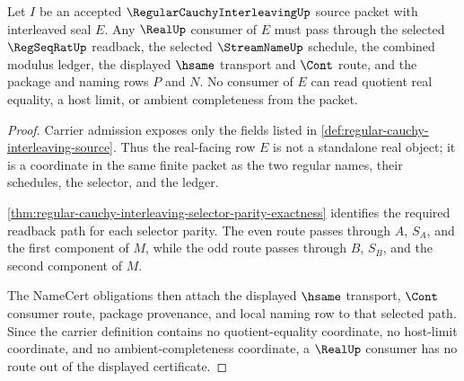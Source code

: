 \begin{theorem}
\label{thm:regular-cauchy-interleaving-real-seal-non-escape}
Let $I$ be an accepted $\RegularCauchyInterleavingUp$ source packet with interleaved seal $E$. Any $\RealUp$ consumer of $E$ must pass through the selected $\RegSeqRatUp$ readback, the selected $\StreamNameUp$ schedule, the combined modulus ledger, the displayed $\hsame$ transport and $\Cont$ route, and the package and naming rows $P$ and $N$. No consumer of $E$ can read quotient real equality, a host limit, or ambient completeness from the packet.
\end{theorem}
\begin{proof}
Carrier admission exposes only the fields listed in \autoref{def:regular-cauchy-interleaving-source}. Thus the real-facing row $E$ is not a standalone real object; it is a coordinate in the same finite packet as the two regular names, their schedules, the selector, and the ledger.

\autoref{thm:regular-cauchy-interleaving-selector-parity-exactness} identifies the required readback path for each selector parity. The even route passes through $A$, $S_A$, and the first component of $M$, while the odd route passes through $B$, $S_B$, and the second component of $M$.

The NameCert obligations then attach the displayed $\hsame$ transport, $\Cont$ consumer route, package provenance, and local naming row to that selected path. Since the carrier definition contains no quotient-equality coordinate, no host-limit coordinate, and no ambient-completeness coordinate, a $\RealUp$ consumer has no route out of the displayed certificate.
\end{proof}

